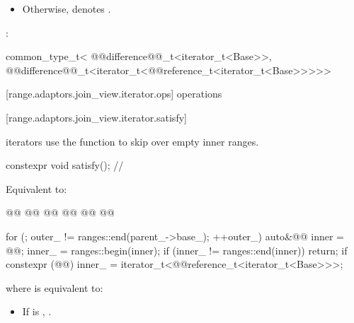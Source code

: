 {{\begin{itemize}
\item Otherwise,  denotes .
\end{itemize}
} %

\pnum
{} 
:
\begin{codeblock}
common_type_t<
  @@difference@@_t<iterator_t<Base>>,
  @@difference@@_t<iterator_t<@@reference_t<iterator_t<Base>>>>>
\end{codeblock}

[range.adaptors.join_view.iterator.ops]{ operations}

[range.adaptors.join_view.iterator.satisfy]{}
{\color{newclr}
\pnum
{} iterators use the  function to skip over empty
inner ranges.

\begin{itemdecl}
constexpr void satisfy(); // \expos
\end{itemdecl}
} %

\begin{itemdescr}
\pnum
\newtxt{\effects}  Equivalent to:
\begin{codeblock}
@@
  @@
    @@
  @@
    @@
@\newtxt{\};}@

for (; outer_ != ranges::end(parent_->base_); ++outer_) {
  auto&@\oldtxt{\&}@ inner = @@;
  inner_ = ranges::begin(inner);
  if (inner_ != ranges::end(inner))
    return;
}
if constexpr (@@)
  inner_ = iterator_t<@@reference_t<iterator_t<Base>>>{};
\end{codeblock}

{\color{oldclr}
where  is equivalent to:
\begin{itemize}
\item If  is ,
.


\end{itemize}}
\end{itemdescr}}

